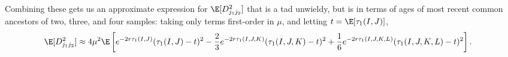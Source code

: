 Combining these gets us an approximate expression for $\E[D_{j_1 j_2}^2]$ 
that is a tad unwieldy,
but is in terms of ages of most recent common ancestors of two, three, and four samples:
taking only terms first-order in $\mu$,
and letting $t = \E[\tau_1(I,J)]$,
\begin{align}
  \E[ D_{j_1 j_2}^2 ] &\approx 4 \mu^2 \E\left[
    e^{-2r \tau_1(I,J)} ( \tau_1(I,J) - t )^2 
    - \frac{2}{3} e^{-2r \tau_1(I,J,K)} ( \tau_1(I,J,K) - t )^2 
    + \frac{1}{6} e^{-2r \tau_1(I,J,K,L)} ( \tau_1(I,J,K,L) - t )^2 
    \right] .
\end{align}



